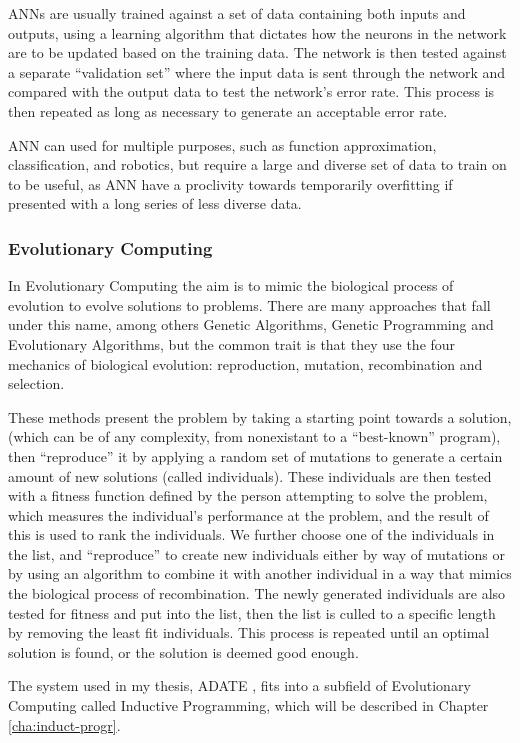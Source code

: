 \documentclass[]{report}
\begin{document}
ANNs are usually trained against a set of data containing both inputs and
outputs, using a learning algorithm that dictates how the neurons in the network
are to be updated based on the training data. The network is then tested against
a separate ``validation set'' where the input data is sent through the network
and compared with the output data to test the network's error rate. This process
is then repeated as long as necessary to generate an acceptable error rate.

ANN can used for multiple purposes, such as function approximation,
classification, and robotics, but require a large and diverse set of data to
train on to be useful, as ANN have a proclivity towards temporarily overfitting
if presented with a long series of less diverse data.

\subsubsection{Evolutionary Computing}
\label{sec:evol-comp}

In Evolutionary Computing the aim is to mimic the biological process of
evolution to evolve solutions to problems. There are many approaches that fall
under this name, among others Genetic Algorithms, Genetic Programming and
Evolutionary Algorithms, but the common trait is that they use the four
mechanics of biological evolution: reproduction, mutation, recombination and
selection.

These methods present the problem by taking a starting point towards a solution,
(which can be of any complexity, from nonexistant to a ``best-known'' program),
then ``reproduce'' it by applying a random set of mutations to generate a
certain amount of new solutions (called individuals). These individuals are then
tested with a fitness function defined by the person attempting to solve the
problem, which measures the individual's performance at the problem, and the
result of this is used to rank the individuals. We further choose one of the
individuals in the list, and ``reproduce'' to create new individuals either by
way of mutations or by using an algorithm to combine it with another individual
in a way that mimics the biological process of recombination. The newly
generated individuals are also tested for fitness and put into the list, then
the list is culled to a specific length by removing the least fit
individuals. This process is repeated until an optimal solution is found, or the
solution is deemed good enough.

The system used in my thesis, ADATE \citep{vattekar2006adate}, fits into a
subfield of Evolutionary Computing called Inductive Programming, which will be
described in Chapter \ref{cha:induct-progr}.
\end{document}
